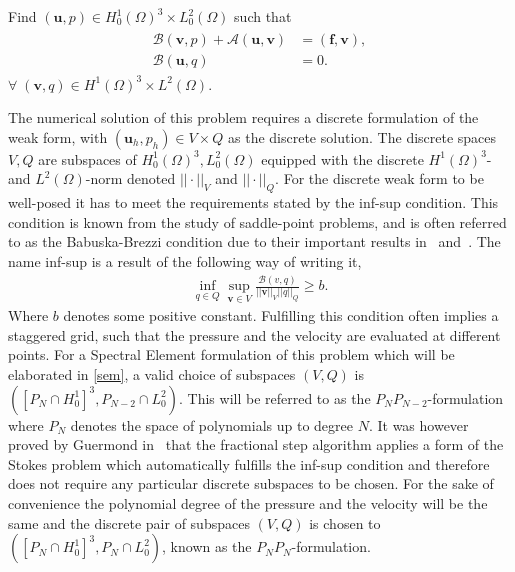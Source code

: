 Find $(\mathbf{u}, p) \in H^1_0(\Omega)^3\times L^2_0(\Omega)$ such that 
\begin{align}
    \begin{split}
           \mathcal{B}(\mathbf{v},p) 
         +\mathcal{A}(\mathbf{u},\mathbf{v}) &= (\mathbf{f},\mathbf{v}), \\
        \mathcal{B}(\mathbf{u},q) &= 0.
    \end{split}
	\label{eq:NSweak}
\end{align}
$\forall\; (\mathbf{v}, q) \in H^1(\Omega)^3\times L^2(\Omega)$.
%

The numerical solution of this problem requires a discrete formulation of the weak form, with $(\mathbf{u}_h,p_h)\in V\times Q$
as the discrete solution. The discrete spaces $V,Q$ are subspaces of $ H_0^1(\Omega)^{3},L^2_0(\Omega)$ equipped with the discrete
$ H^1(\Omega) ^3$- and $L^2(\Omega)$-norm denoted $||\cdot||_V$ and $||\cdot||_Q$. 
For the discrete weak form to be well-posed it has to meet the requirements stated by the
inf-sup condition. This condition is known from the study of saddle-point problems, and 
is often referred to as the Babuska-Brezzi condition due to their important results
in~\cite{Babuska} and~\cite{Brezzi}. The name inf-sup is a result of the
following way of writing it,
%
\begin{align}
    \inf_{q\in Q}\sup_{\mathbf{v}\in V}\frac{\mathcal{B}(v,q)}{||\mathbf{v}||_V||q||_Q} \ge b.
    \label{eq:infsup}
\end{align}
%
Where $b$ denotes some positive constant. Fulfilling this condition often implies
a staggered grid, such that the pressure and the velocity are evaluated at different points. 
For a Spectral Element formulation of this problem which will be elaborated in \cref{sem},
a valid choice of subspaces $(V,Q)$ is $(\left[  P_N\cap H^1_0\right]^3,P_{N-2} \cap L^{2}_{0})$. This will be referred to as the 
$P_NP_{N-2}$-formulation where $P_N$ denotes the space of polynomials up to degree $N$.
It was however proved by Guermond in~\cite{GuermondPnPn} that the fractional step algorithm applies a 
form of the Stokes problem which automatically fulfills the inf-sup condition and therefore does not require any particular 
discrete subspaces to be chosen. For the sake of convenience the polynomial degree of the pressure and the velocity will be 
the same and the discrete pair of subspaces $(V,Q)$ is chosen to $(\left[ P_N\cap H^1_0 \right]^3,P_{N} \cap L^{2}_{0})$,
known as the $P_NP_N$-formulation.

